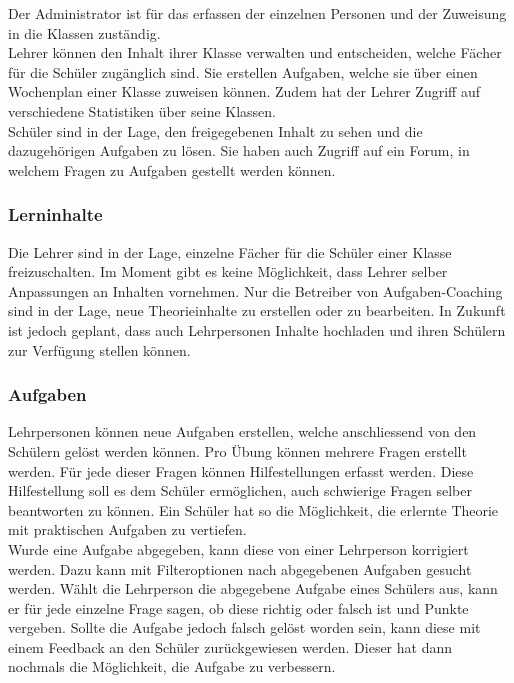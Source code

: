 Der Administrator ist für das erfassen der einzelnen Personen und der Zuweisung in die Klassen zuständig. \\

Lehrer können den Inhalt ihrer Klasse verwalten und entscheiden, welche Fächer für die Schüler zugänglich sind. Sie erstellen Aufgaben, welche sie über einen Wochenplan einer Klasse zuweisen können. Zudem hat der Lehrer Zugriff auf verschiedene Statistiken über seine Klassen. \\

Schüler sind in der Lage, den freigegebenen Inhalt zu sehen und die dazugehörigen Aufgaben zu lösen. Sie haben auch Zugriff auf ein Forum, in welchem Fragen zu Aufgaben gestellt werden können.

\subsubsection*{Lerninhalte}
Die Lehrer sind in der Lage, einzelne Fächer für die Schüler einer Klasse freizuschalten. Im Moment gibt es keine Möglichkeit, dass Lehrer selber Anpassungen an Inhalten vornehmen. Nur die Betreiber von Aufgaben-Coaching sind in der Lage, neue Theorieinhalte zu erstellen oder zu bearbeiten. In Zukunft ist jedoch geplant, dass auch Lehrpersonen Inhalte hochladen und ihren Schülern zur Verfügung stellen können.

\subsubsection*{Aufgaben}
Lehrpersonen können neue Aufgaben erstellen, welche anschliessend von den Schülern gelöst werden können. Pro Übung können mehrere Fragen erstellt werden. Für jede dieser Fragen können Hilfestellungen erfasst werden. Diese Hilfestellung soll es dem Schüler ermöglichen, auch schwierige Fragen selber beantworten zu können. Ein Schüler hat so die Möglichkeit, die erlernte Theorie mit praktischen Aufgaben zu vertiefen. \\

Wurde eine Aufgabe abgegeben, kann diese von einer Lehrperson korrigiert werden. Dazu kann mit Filteroptionen nach abgegebenen Aufgaben gesucht werden. Wählt die Lehrperson die abgegebene Aufgabe eines Schülers aus, kann er für jede einzelne Frage sagen, ob diese richtig oder falsch ist und Punkte vergeben. Sollte die Aufgabe jedoch falsch gelöst worden sein, kann diese mit einem Feedback an den Schüler zurückgewiesen werden. Dieser hat dann nochmals die Möglichkeit, die Aufgabe zu verbessern. 

